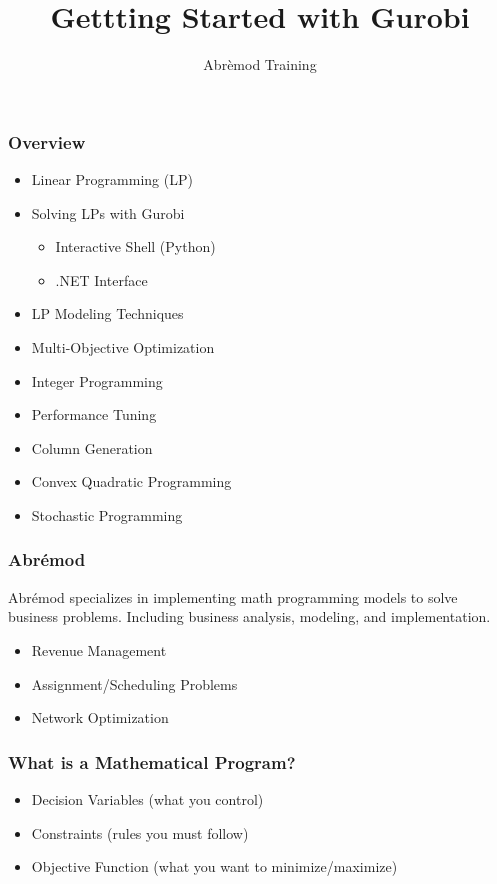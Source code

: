 \documentclass[12pt,handout]{beamer}
\title{Gettting Started with Gurobi}
\author{Abr\`emod Training}
\begin{document}
\begin{frame}
\titlepage
\end{frame}

\begin{frame}
\frametitle{Overview}
\begin{itemize}
\item Linear Programming (LP)
\item Solving LPs with Gurobi
    \begin{itemize}
    \item Interactive Shell (Python)
    \item .NET Interface
    \end{itemize}
\item LP Modeling Techniques
\item Multi-Objective Optimization
\item Integer Programming
\item Performance Tuning
\item Column Generation
\item Convex Quadratic Programming
\item Stochastic Programming
\end{itemize}
\end{frame}

\begin{frame}
  \frametitle{Abr\'emod}
Abr\'emod specializes in implementing math programming models to solve business problems.
Including business analysis, modeling, and implementation.
\begin{itemize}
\item Revenue Management
\item Assignment/Scheduling Problems
\item Network Optimization
\end{itemize}
\end{frame}

\begin{frame}
\frametitle{What is a Mathematical Program?}
\begin{itemize}
\item Decision Variables (what you control)
\item Constraints (rules you must follow)
\item Objective Function (what you want to minimize/maximize)
\end{itemize}
\end{frame}
\end{document}
